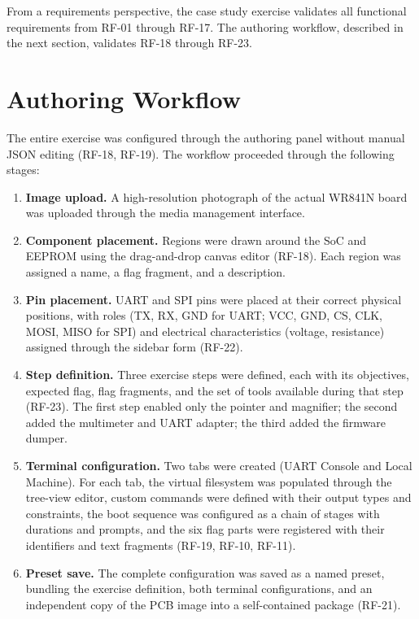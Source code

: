 From a requirements perspective, the case study exercise validates all functional requirements from RF-01 through RF-17. The authoring workflow, described in the next section, validates RF-18 through RF-23.

\section{Authoring Workflow}\label{sec:authoring-workflow}

The entire exercise was configured through the authoring panel without manual JSON editing (RF-18, RF-19). The workflow proceeded through the following stages:

\begin{enumerate}
    \item \textbf{Image upload.} A high-resolution photograph of the actual WR841N board was uploaded through the media management interface.
    \item \textbf{Component placement.} Regions were drawn around the SoC and EEPROM using the drag-and-drop canvas editor (RF-18). Each region was assigned a name, a flag fragment, and a description.
    \item \textbf{Pin placement.} UART and SPI pins were placed at their correct physical positions, with roles (TX, RX, GND for UART; VCC, GND, CS, CLK, MOSI, MISO for SPI) and electrical characteristics (voltage, resistance) assigned through the sidebar form (RF-22).
    \item \textbf{Step definition.} Three exercise steps were defined, each with its objectives, expected flag, flag fragments, and the set of tools available during that step (RF-23). The first step enabled only the pointer and magnifier; the second added the multimeter and UART adapter; the third added the firmware dumper.
    \item \textbf{Terminal configuration.} Two tabs were created (UART Console and Local Machine). For each tab, the virtual filesystem was populated through the tree-view editor, custom commands were defined with their output types and constraints, the boot sequence was configured as a chain of stages with durations and prompts, and the six flag parts were registered with their identifiers and text fragments (RF-19, RF-10, RF-11).
    \item \textbf{Preset save.} The complete configuration was saved as a named preset, bundling the exercise definition, both terminal configurations, and an independent copy of the PCB image into a self-contained package (RF-21).
\end{enumerate}

